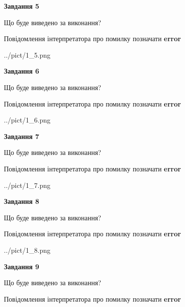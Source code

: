 \documentclass[11pt, ukrainian]{article}
\begin{document}
{\begin {large}
{\begin {center}\textbf{Завдання 5}\end {center}}\par
Що буде виведено за виконання? \par
Повідомлення інтерпретатора про помилку позначати \textbf{error}

\begin{center}
	{../pict/1_5.png}
\end{center}
\newpage

{\begin {center}\textbf{Завдання 6}\end {center}}\par
Що буде виведено за виконання? \par
Повідомлення інтерпретатора про помилку позначати \textbf{error}

\begin{center}
	{../pict/1_6.png}
\end{center}
\newpage

{\begin {center}\textbf{Завдання 7}\end {center}}\par
Що буде виведено за виконання? \par
Повідомлення інтерпретатора про помилку позначати \textbf{error}

\begin{center}
	{../pict/1_7.png}
\end{center}
\newpage

{\begin {center}\textbf{Завдання 8}\end {center}}\par
Що буде виведено за виконання? \par
Повідомлення інтерпретатора про помилку позначати \textbf{error}

\begin{center}
	{../pict/1_8.png}
\end{center}
\newpage

{\begin {center}\textbf{Завдання 9}\end {center}}\par
Що буде виведено за виконання? \par
Повідомлення інтерпретатора про помилку позначати \textbf{error}


\end{large}}
\end{document}
